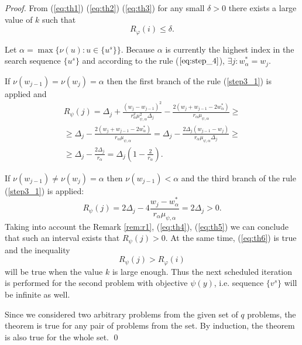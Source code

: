\documentclass[runningheads]{llncs}
\begin{document}
\begin{proof}
  From (\ref{eq:th1}) (\ref{eq:th2}) (\ref{eq:th3}) for any small \(\delta > 0\) there exists a large value of \(k\) such that
  \begin{equation}
    R_\varphi(i)\leqslant \delta.
    \label{eq:th6}
  \end{equation}

  Let \(\alpha = \max\{\nu(u):u\in\{u^s\}\}\). Because \(\alpha\) is currently the highest index
  in the search sequence \(\{u^s\}\) and according to the rule (\(\ref{eq:step_4}\)), \(\exists j: w^*_\alpha=w_j\).

  If \(\nu(w_{j-1})=\nu(w_{j})=\alpha\) then the first branch of the rule (\ref{step3_1}) is applied and
  \begin{equation}
    \begin{array}{l}
      R_\psi(j)=\Delta_j + \frac{(w_j-w_{j-1})^2}{r_\alpha^2\mu_{\psi,\alpha}^2\Delta_j}
        - \frac{2(w_j+w_{j-1}-2w^*_\alpha)}{r_\alpha\mu_{\psi,\alpha}} \geqslant \\
        \geqslant\Delta_j - \frac{2(w_j+w_{j-1}-2w^*_\alpha)}{r_\alpha\mu_{\psi,\alpha}} =
        \Delta_j - \frac{2\Delta_j(w_{j-1}-w_j)}{r_\alpha\mu_{\psi,\alpha}\Delta_j} \geqslant\\
        \geqslant \Delta_j - \frac{2\Delta_j}{r_\alpha} = \Delta_j\left(1-\frac{2}{r_\alpha}\right).
      \end{array}
    \label{eq:th4}
  \end{equation}

  If \(\nu(w_{j-1})\ne\nu(w_{j})=\alpha\) then \(\nu(w_{j-1})<\alpha\) and the third branch of
  the rule (\ref{step3_1}) is applied:
  \begin{equation}
    R_\psi(j)=2\Delta_j - 4 \frac{w_j-w^*_{\alpha}}{r_\alpha \mu_{\psi,\alpha}}=2\Delta_j > 0.
    \label{eq:th5}
  \end{equation}
  Taking into account the Remark \ref{rem:r1}, (\ref{eq:th4}), (\ref{eq:th5}) we can conclude that such an interval
  exists that \(R_\psi(j)>0\). At the same time, (\ref{eq:th6}) is true and
  the inequality
  \begin{displaymath}
    R_\psi(j) > R_\varphi(i)
  \end{displaymath}
  will be true when the value \(k\) is large enough. Thus the next scheduled iteration is performed for
  the second problem with objective \(\psi(y)\), i.e. sequence \(\{v^s\}\) will be infinite as well.

  Since we considered two arbitrary problems from the given set of \(q\) problems, the theorem is
  true for any pair of problems from the set. By induction, the theorem is also true for the whole
  set.
\qed
\end{proof}
\end{document}
